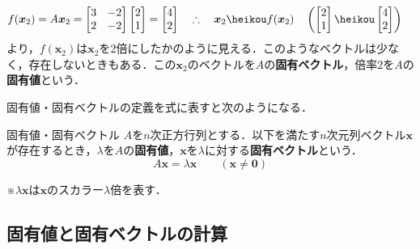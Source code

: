 \begin{align*}
	&f(\bm{x}_2) = A\bm{x}_2 =
	\begin{bmatrix*}[r]
		3 & -2\\ 2 & -2
	\end{bmatrix*}
	\begin{bmatrix*}[r]
		2\\ 1
	\end{bmatrix*}
	=
	\begin{bmatrix*}[r]
		4\\ 2
	\end{bmatrix*}
	&
	&\therefore\quad \bm{x}_2 \heikou f(\bm{x}_2) \quad \left(
		\begin{bmatrix*}[r]
			2\\ 1
		\end{bmatrix*}
		\heikou
		\begin{bmatrix*}[r]
			4\\ 2
		\end{bmatrix*}
	\right)
\end{align*}
より，$f(\bm{x}_2)$は$\bm{x}_2$を2倍にしたかのように見える．このようなベクトルは少なく，存在しないときもある．この$\bm{x}_2$のベクトルを$A$の\textbf{固有ベクトル}，倍率$2$を$A$の\textbf{固有値}という．

固有値・固有ベクトルの定義を式に表すと次のようになる．
\begin{kousiki}{固有値・固有ベクトル}
	$A$を$n$次正方行列とする．以下を満たす$n$次元列ベクトル$\bm{x}$が存在するとき，$\lambda$を$A$の\textbf{固有値}，$\bm{x}$を$\lambda$に対する\textbf{固有ベクトル}という．
	\begin{equation}
		A\bm{x} = \lambda\bm{x} \qquad (\bm{x} \ne \bm{0})
	\end{equation}
\end{kousiki}

※$\lambda\bm{x}$は$\bm{x}$のスカラー$\lambda$倍を表す．



\subsection{固有値と固有ベクトルの計算}

